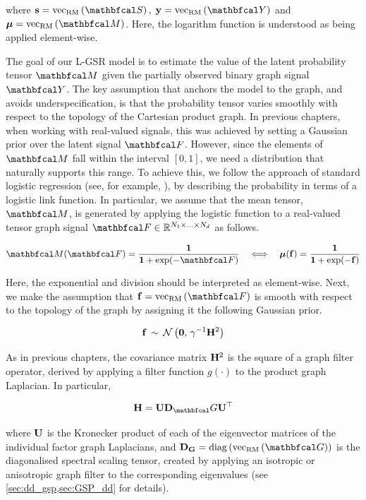 where $\s = \vecrm{\St}, \; \y = \vecrm{\Yt}$ and $\muu = \vecrm{\Mt}$. Here, the logarithm function is understood as being applied element-wise.

The goal of our L-GSR model is to estimate the value of the latent probability tensor $\Mt$ given the partially observed binary graph signal $\Yt$. The key assumption that anchors the model to the graph, and avoids underspecification, is that the probability tensor varies smoothly with respect to the topology of the Cartesian product graph. In previous chapters, when working with real-valued signals, this was achieved by setting a Gaussian prior over the latent signal $\Ft$. However, since the elements of $\Mt$ fall within the interval $[0, 1]$, we need a distribution that naturally supports this range. To achieve this, we follow the approach of standard logistic regression (see, for example, \cite{Murphy2012}), by describing the probability in terms of a logistic link function. In particular, we assume that the mean tensor, $\Mt$, is generated by applying the logistic function to a real-valued tensor graph signal $\Ft \in \R^{N_1 \times ... \times N_d}$ as follows. 

\begin{equation}
    \label{eq:logistic_link}
    \Mt(\Ft) = \frac{\one}{\one + \exp(-\Ft)} \quad \Longleftrightarrow \quad \muu(\f) = \frac{\one}{\one + \exp(-\f)}
\end{equation}

Here, the exponential and division should be interpreted as element-wise. Next, we make the assumption that $\f = \vecrm{\Ft}$ is smooth with respect to the topology of the graph by assigning it the following Gaussian prior. 

\begin{equation}
    \label{eq:f_prior_logit}
    \mathbf{f}  \, \sim \, \mathcal{N}\left( \mathbf{0}, \, \gamma^{-1} \mathbf{H}^2 \right) 
\end{equation}

As in previous chapters, the covariance matrix $\mathbf{H}^2$ is the square of a graph filter operator, derived by applying a filter function $g(\cdot)$ to the product graph Laplacian. In particular, 

\begin{equation*}
    \HH = \U \D_\Gt \U^\top
\end{equation*}

where $\mathbf{U}$ is the Kronecker product of each of the eigenvector matrices of the individual factor graph Laplacians, and $\D_\G = \diag{\vecrm{\Gt}}$ is the diagonalised spectral scaling tensor, created by applying an isotropic or anisotropic graph filter to the corresponding eigenvalues (see \cref{sec:dd_gsp,sec:GSP_dd} for details). 

